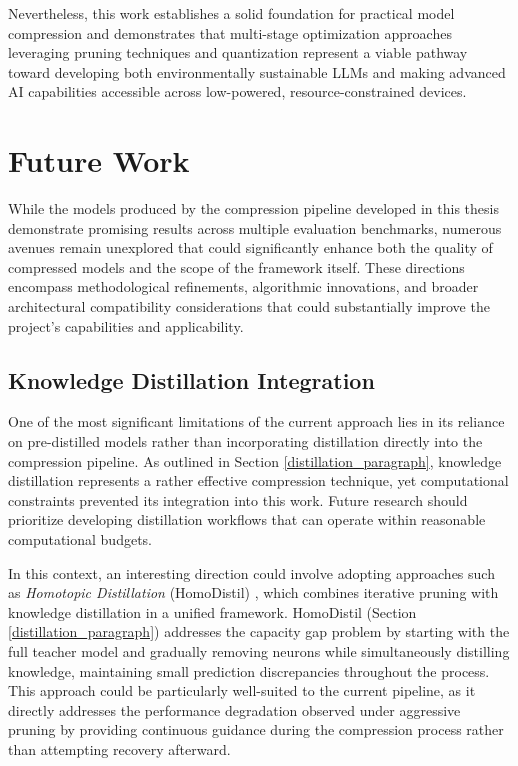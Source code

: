 Nevertheless, this work establishes a solid foundation for practical model compression and demonstrates that multi-stage optimization approaches leveraging pruning techniques and quantization represent a viable pathway toward developing both environmentally sustainable LLMs and making advanced AI capabilities accessible across low-powered, resource-constrained devices.

\section{Future Work} \label{future_work}

While the models produced by the compression pipeline developed in this thesis demonstrate promising results across multiple evaluation benchmarks, numerous avenues remain unexplored that could significantly enhance both the quality of compressed models and the scope of the framework itself. These directions encompass methodological refinements, algorithmic innovations, and broader architectural compatibility considerations that could substantially improve the project's capabilities and applicability.

\subsection{Knowledge Distillation Integration}

One of the most significant limitations of the current approach lies in its reliance on pre-distilled models rather than incorporating distillation directly into the compression pipeline. As outlined in Section \ref{distillation_paragraph}, knowledge distillation represents a rather effective compression technique, yet computational constraints prevented its integration into this work. Future research should prioritize developing distillation workflows that can operate within reasonable computational budgets.

In this context, an interesting direction could involve adopting approaches such as \textit{Homotopic Distillation} (HomoDistil) \cite{homodistil}, which combines iterative pruning with knowledge distillation in a unified framework. HomoDistil (Section \ref{distillation_paragraph}) addresses the capacity gap problem by starting with the full teacher model and gradually removing neurons while simultaneously distilling knowledge, maintaining small prediction discrepancies throughout the process. This approach could be particularly well-suited to the current pipeline, as it directly addresses the performance degradation observed under aggressive pruning by providing continuous guidance during the compression process rather than attempting recovery afterward.

